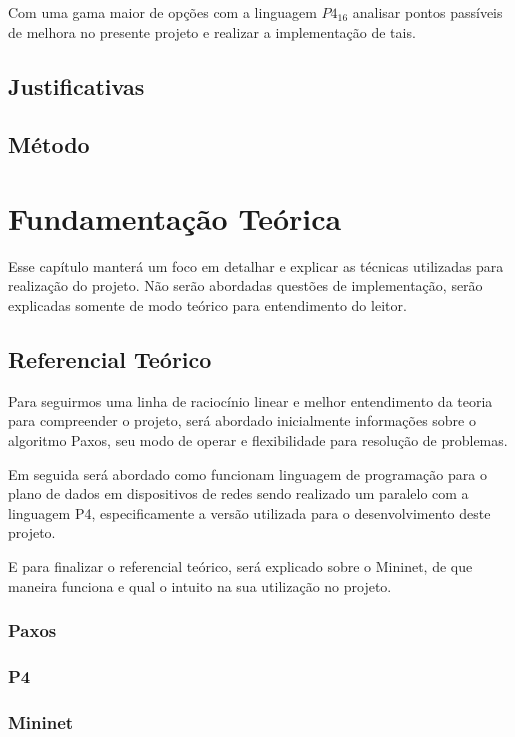 \documentclass[12pt,
openright, 
oneside,
a4paper,
brazil]{facom-ufu-abntex2}
\begin{document}
Com uma gama maior de opções com a linguagem $P4_{16}$ analisar pontos passíveis
de melhora no presente projeto e realizar a implementação de tais.

\section{Justificativas}
\section{Método}

\chapter{Fundamentação Teórica}
Esse capítulo manterá um foco em detalhar e explicar as técnicas utilizadas
para realização do projeto. Não serão abordadas questões de implementação,
serão explicadas somente de modo teórico para entendimento do leitor.

\section{Referencial Teórico}
Para seguirmos uma linha de raciocínio linear e melhor entendimento da teoria
para compreender o projeto, será abordado inicialmente informações sobre o 
algoritmo Paxos, seu modo de operar e flexibilidade para resolução de problemas.

Em seguida será abordado como funcionam linguagem de programação para o plano de
dados em dispositivos de redes sendo realizado um paralelo com a linguagem P4, 
especificamente a versão utilizada para o desenvolvimento deste projeto.

E para finalizar o referencial teórico, será explicado sobre o Mininet, de que
maneira funciona e qual o intuito na sua utilização no projeto.

\subsection{Paxos}
\subsection{P4}
\subsection{Mininet}
\end{document}
